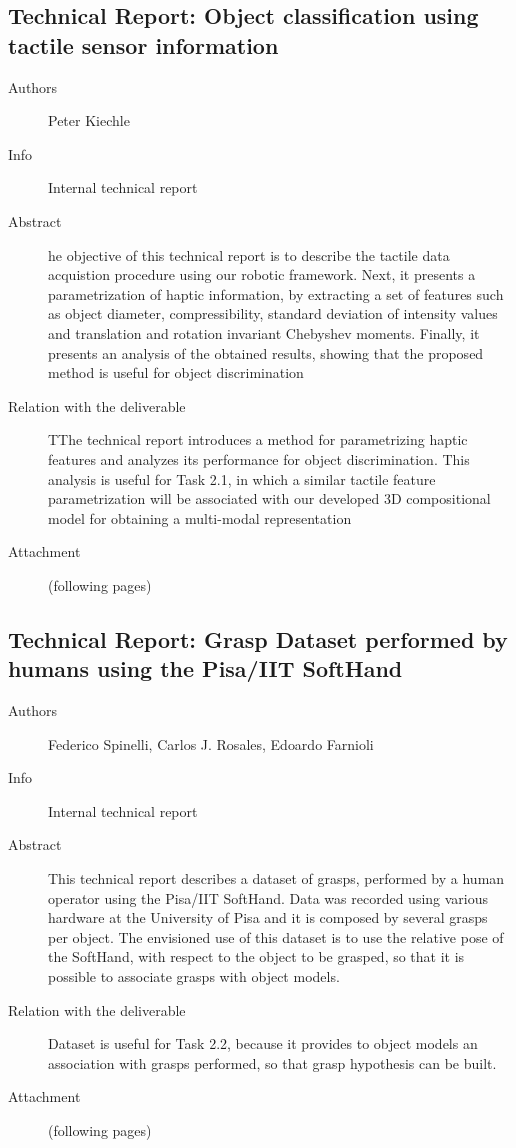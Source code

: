 \documentclass[a4paper,11pt,pdf]{pacmanreport}
\begin{document}
\subsection{Technical Report: Object classification using tactile sensor information} \label{ann:techReportKiechle}
\begin{description}
\item[Authors] Peter Kiechle
\item[Info] Internal technical report
\item[Abstract] he objective of this technical report is to describe the 
tactile data acquistion procedure using our robotic framework. Next, it presents 
a parametrization of haptic information, by extracting a set of features such as 
object diameter, compressibility, standard deviation of intensity values and 
translation and rotation invariant Chebyshev moments. Finally, it presents an 
analysis of the obtained results, showing that the proposed method is useful for 
object discrimination
\item[Relation with the deliverable] TThe technical report introduces a method for parametrizing haptic features and 
analyzes its performance for object discrimination. This analysis is useful for 
Task 2.1, in which a similar tactile feature parametrization will be associated 
with our developed 3D compositional model for obtaining a multi-modal 
representation
\item[Attachment] (following pages)
\end{description}


\subsection{Technical Report: Grasp Dataset performed by humans using the Pisa/IIT SoftHand} \label{ann:techReportFederico}
\begin{description}
\item[Authors] Federico Spinelli, Carlos J. Rosales, Edoardo Farnioli
\item[Info] Internal technical report
\item[Abstract] This technical report describes a dataset of grasps, performed by a human operator 
  using the Pisa/IIT SoftHand. Data was recorded using various hardware at
the University of Pisa and it is composed by several grasps per object. The envisioned 
use of this dataset is to use the relative pose of the SoftHand, with respect to the object to
be grasped, so that it is possible to associate grasps with object models.
\item[Relation with the deliverable] Dataset is useful for Task 2.2, because it provides 
  to object models an association with grasps performed, so that grasp hypothesis can be built. 
\item[Attachment] (following pages)
\end{description}

\end{document}
